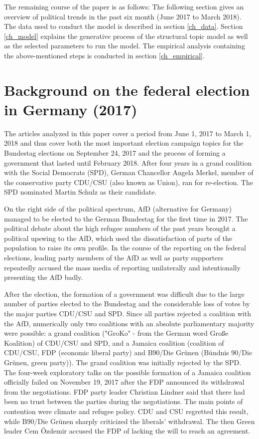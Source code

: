 \documentclass[12pt,a4paper,notitlepage]{article}
\begin{document}
The remaining course of the paper is as follows: The following section gives an overview of political trends in the past six month (June 2017 to March 2018). The data used to conduct the model is described in section \ref{ch_data}. Section \ref{ch_model} explains the generative process of the structural topic model as well as the selected parameters to run the model. The empirical analysis containing the above-mentioned steps is conducted in section \ref{ch_empirical}. 
 
\section{Background on the federal election in Germany (2017)}\label{ch_elections}

The articles analyzed in this paper cover a period from June 1, 2017 to March 1, 2018 and thus cover both the most important election campaign topics for the Bundestag elections on September 24, 2017 and the process of forming a government that lasted until February 2018. After four years in a grand coalition with the Social Democrats (SPD), German Chancellor Angela Merkel, member of the conservative party CDU/CSU (also known as Union), ran for re-election. The SPD nominated Martin Schulz as their candidate. 

On the right side of the political spectrum, AfD (alternative for Germany) managed to be elected to the German Bundestag for the first time in 2017. The political debate about the high refugee numbers of the past years brought a political upswing to the AfD, which used the dissatisfaction of parts of the population to raise its own profile. In the course of the reporting on the federal elections, leading party members of the AfD as well as party supporters repeatedly accused the mass media of reporting unilaterally and intentionally presenting the AfD badly.

After the election, the formation of a government was difficult due to the large number of parties elected to the Bundestag and the considerable loss of votes by the major parties CDU/CSU and SPD. Since all parties rejected a coalition with the AfD, numerically only two coalitions with an absolute parliamentary majority were possible: a grand coalition ("GroKo" - from the German word Große Koalition) of CDU/CSU and SPD, and a Jamaica coalition (coalition of CDU/CSU, FDP (economic liberal party) and B90/Die Grünen (Bündnis 90/Die Grünen, green party)). The grand coalition was initially rejected by the SPD. The four-week exploratory talks on the possible formation of a Jamaica coalition officially failed on November 19, 2017 after the FDP announced its withdrawal from the negotiations. FDP party leader Christian Lindner said that there had been no trust between the parties during the negotiations. The main points of contention were climate and refugee policy. CDU and CSU regretted this result, while B90/Die Grünen sharply criticized the liberals’ withdrawal. The then Green leader Cem Özdemir accused the FDP of lacking the will to reach an agreement.
\end{document}
